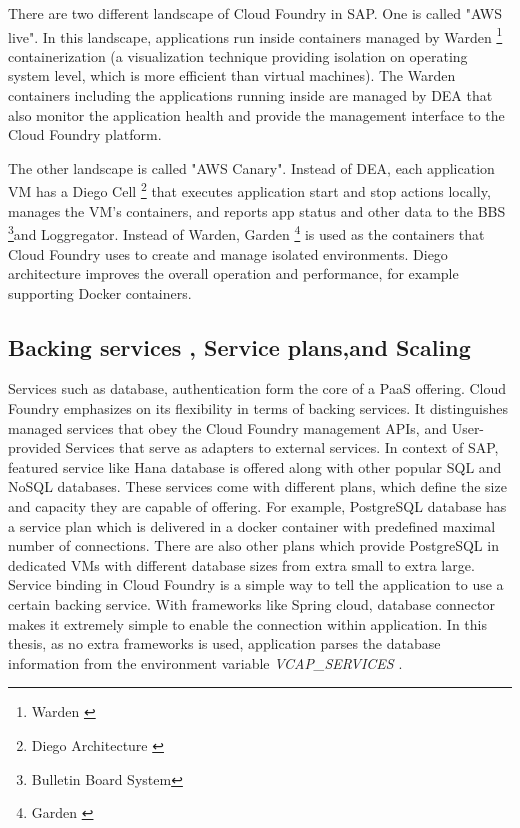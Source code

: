 There are two different landscape of Cloud Foundry in SAP. One is called "AWS live". In this landscape, applications run inside containers managed by Warden  \footnote{Warden \citep{Warden} } containerization (a visualization technique providing isolation on operating system level, which is more efficient than virtual machines). The Warden containers including the applications running inside are managed by \ac{DEA} that also monitor the application health and provide the management interface to the Cloud Foundry platform.

The other landscape is called "AWS Canary". Instead of \ac{DEA}, each application VM has a Diego Cell  \footnote{Diego Architecture \citep{Diego}} that executes application start and stop actions locally, manages the VM’s containers, and reports app status and other data to the \ac{BBS} \footnote{Bulletin Board System\citep{BBS} }and Loggregator. Instead of Warden, Garden \footnote{Garden \citep{Garden}} is used as the containers that Cloud Foundry uses to create and manage isolated environments. Diego architecture improves the overall operation and performance, for example supporting Docker containers.

\subsection{ Backing services , Service plans,and Scaling}
Services such as database, authentication form the core of a \ac{PaaS} offering. Cloud Foundry emphasizes on its flexibility in terms of backing services. It distinguishes managed services that obey the Cloud Foundry management APIs, and User-provided Services that serve as adapters to external services. In context of SAP, featured service like Hana database is offered along with other popular SQL and NoSQL databases. These services come with different plans, which define the size and capacity they are capable of offering. For example, PostgreSQL database has a service plan which is delivered in a docker container with predefined maximal number of connections. There are also other plans which provide PostgreSQL in dedicated VMs with different database sizes from extra small to extra large. \\
Service binding in Cloud Foundry is a simple way to tell the application to use a certain backing service. With frameworks like Spring cloud, database connector makes it extremely simple to enable the connection within application. In this thesis, as no extra frameworks is used, application parses the database information from the environment variable \textit{VCAP\_SERVICES} . \\

